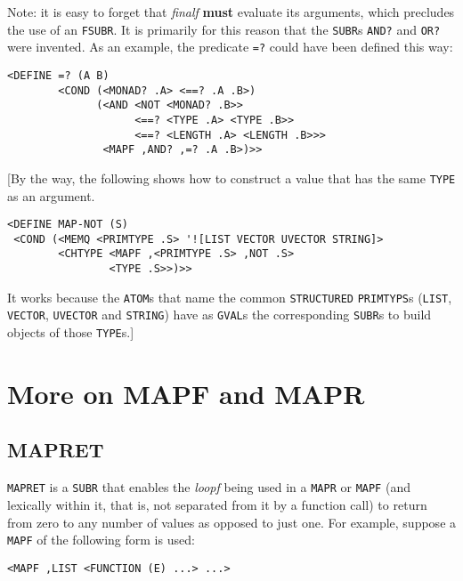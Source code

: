\documentclass[a4paper]{scrbook}
\begin{document}
Note: it is easy to forget that \emph{finalf} \textbf{must} evaluate its arguments, which precludes the use of an
\texttt{FSUBR}. It is primarily for this reason that the \texttt{SUBR}s \texttt{AND?}  and
\texttt{OR?}  were invented. As an example, the predicate \texttt{=?}  could have
been defined this way:

\begin{verbatim}
<DEFINE =? (A B)
        <COND (<MONAD? .A> <==? .A .B>)
              (<AND <NOT <MONAD? .B>>
                    <==? <TYPE .A> <TYPE .B>>
                    <==? <LENGTH .A> <LENGTH .B>>>
               <MAPF ,AND? ,=? .A .B>)>>
\end{verbatim}

{[}By the way, the following shows how to construct a value that has the same \texttt{TYPE}  as an
argument.

\begin{verbatim}
<DEFINE MAP-NOT (S)
 <COND (<MEMQ <PRIMTYPE .S> '![LIST VECTOR UVECTOR STRING]>
        <CHTYPE <MAPF ,<PRIMTYPE .S> ,NOT .S>
                <TYPE .S>>)>>
\end{verbatim}

It works because the \texttt{ATOM}s that name the common \texttt{STRUCTURED} \texttt{PRIMTYPS}s (\texttt{LIST},
\texttt{VECTOR}, \texttt{UVECTOR} and \texttt{STRING}) have as \texttt{GVAL}s the corresponding \texttt{SUBR}s to build
objects of those \texttt{TYPE}s.{]}

\section{More on MAPF and MAPR}\label{more-on-mapf-and-mapr}

\subsection{MAPRET}\label{mapret}

\texttt{MAPRET}  is a \texttt{SUBR} that enables the \emph{loopf} being used in a
\texttt{MAPR} or \texttt{MAPF} (and lexically within it, that is, not separated from it by a function call) to return from
zero to any number of values as opposed to just one. For example, suppose a \texttt{MAPF} of the following form is used:

\begin{verbatim}
<MAPF ,LIST <FUNCTION (E) ...> ...>
\end{verbatim}
\end{document}

